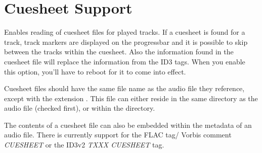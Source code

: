 %

\section{Cuesheet Support}
  Enables reading of cuesheet files for played tracks. If a cuesheet is found
  for a track, track markers are displayed on the progressbar and it is
  possible to skip between the tracks within the cuesheet. Also the information
  found in the cuesheet file will replace the information from the ID3 tags.
  When you enable this option, you'll have to reboot for it to come into
  effect.

  Cuesheet files should have the same file name as the audio file they
  reference, except with the extension . This file can either
  reside in the same directory as the audio file (checked first), or within the
   directory.
  
  The contents of a cuesheet file can also be embedded within the metadata of
  an audio file. There is currently support for the FLAC tag/ Vorbis comment
  \emph{CUESHEET} or the ID3v2 \emph{TXXX CUESHEET} tag.
  
